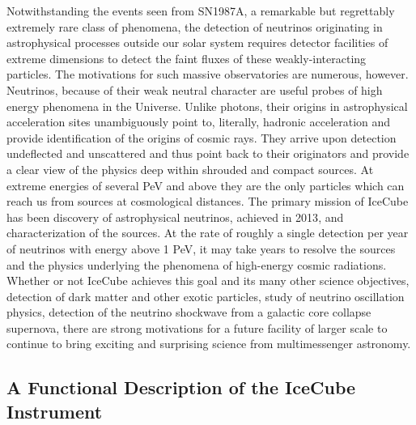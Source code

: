Notwithstanding the events seen from SN1987A, a remarkable but regrettably
extremely rare class of phenomena, the detection of neutrinos originating in
astrophysical processes outside our solar system requires detector facilities of
extreme dimensions to detect the faint fluxes of these weakly-interacting
particles. The motivations for such massive observatories are numerous, however.
Neutrinos, because of their weak neutral character are useful probes of high
energy phenomena in the Universe. Unlike photons, their origins in astrophysical
acceleration sites unambiguously point to, literally, hadronic acceleration and
provide identification of the origins of cosmic rays. They arrive upon detection
undeflected and unscattered and thus point back to their originators and provide
a clear view of the physics deep within shrouded and compact sources. At extreme
energies of several PeV and above they are the only particles which can reach 
us from sources at cosmological distances.  The primary mission of IceCube has 
been discovery of astrophysical neutrinos, achieved in 2013\cite{HESE1}, and 
characterization of the sources.  At the rate of roughly a single detection
per year of neutrinos with energy above 1 PeV, it may take years to resolve the 
sources and the physics underlying the phenomena of high-energy cosmic 
radiations.  Whether or not IceCube achieves this goal and its many other
science objectives, detection of dark matter and other exotic particles,
study of neutrino oscillation physics, detection of the neutrino shockwave
from a galactic core collapse supernova, there are strong motivations for a 
future facility of larger scale to continue to bring exciting and surprising
science from multimessenger astronomy.


\subsection{A Functional Description of the IceCube Instrument}


